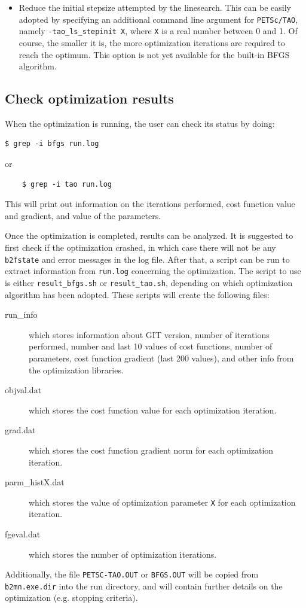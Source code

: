 \begin{itemize}
\begin{itemize}
  	\item Reduce the initial stepsize attempted by the linesearch. This can be easily adopted by specifying an additional command line argument for {\tt PETSc/TAO}, namely \verb|-tao_ls_stepinit X|, where \verb|X| is a real number between 0 and 1. Of course, the smaller it is, the more optimization iterations are required to reach the optimum. This option is not yet available for the built-in BFGS algorithm.
  \end{itemize} 
\end{itemize}

\subsection{Check optimization results}\label{sec:optim_results}

When the optimization is running, the user can check its status by doing:
\begin{verbatim}
$ grep -i bfgs run.log
\end{verbatim}
or
\begin{verbatim}
	$ grep -i tao run.log
\end{verbatim}

This will print out information on the iterations performed, cost function value and gradient, and value of the parameters.

Once the optimization is completed, results can be analyzed. It is suggested to first check if the optimization crashed, in which case there will not be any {\tt b2fstate} and error messages in the log file. After that, a script can be run to extract information from {\tt run.log} concerning the optimization. The script to use is either {\tt result\_bfgs.sh} or {\tt result\_tao.sh}, depending on which optimization algorithm has been adopted. These scripts will create the following files:
\begin{description}
  \item[run\_info] which stores information about GIT version, number of iterations performed, number and last 10 values of cost functions, number of parameters, cost function gradient (last 200 values), and other info from the optimization libraries.
  \item[objval.dat] which stores the cost function value for each optimization iteration.
  \item[grad.dat] which stores the cost function gradient norm for each optimization iteration.
  \item[parm\_histX.dat] which stores the value of optimization parameter {\tt X} for each optimization iteration.
  \item[fgeval.dat] which stores the number of optimization iterations.
\end{description}
Additionally, the file {\tt PETSC-TAO.OUT} or {\tt BFGS.OUT} will be copied from {\tt b2mn.exe.dir} into the run directory, and will contain further details on the optimization (e.g. stopping criteria).

